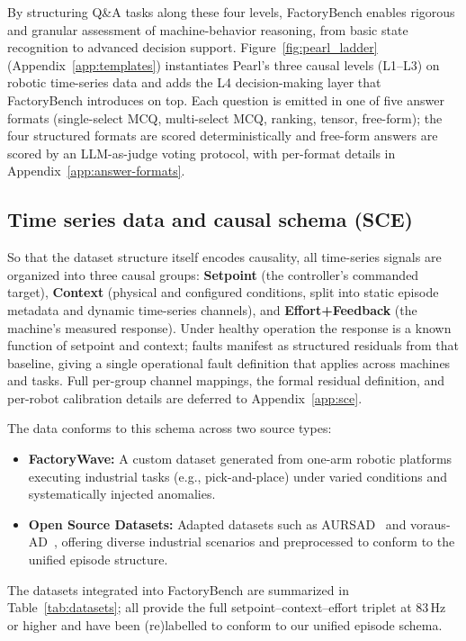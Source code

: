 \documentclass{article}
\begin{document}
By structuring Q\&A tasks along these four levels, FactoryBench enables rigorous and granular assessment of machine-behavior reasoning, from basic state recognition to advanced decision support. Figure~\ref{fig:pearl_ladder} (Appendix~\ref{app:templates}) instantiates Pearl's three causal levels (L1--L3) on robotic time-series data and adds the L4 decision-making layer that FactoryBench introduces on top. Each question is emitted in one of five answer formats (single-select MCQ, multi-select MCQ, ranking, tensor, free-form); the four structured formats are scored deterministically and free-form answers are scored by an LLM-as-judge voting protocol, with per-format details in Appendix~\ref{app:answer-formats}.


\subsection{Time series data and causal schema (SCE)}
\label{sec:sce}

So that the dataset structure itself encodes causality, all time-series signals are organized into three causal groups: \textbf{Setpoint} (the controller's commanded target), \textbf{Context} (physical and configured conditions, split into static episode metadata and dynamic time-series channels), and \textbf{Effort+Feedback} (the machine's measured response). Under healthy operation the response is a known function of setpoint and context; faults manifest as structured residuals from that baseline, giving a single operational fault definition that applies across machines and tasks. Full per-group channel mappings, the formal residual definition, and per-robot calibration details are deferred to Appendix~\ref{app:sce}.

The data conforms to this schema across two source types:

\begin{itemize}
    \item \textbf{FactoryWave:} A custom dataset generated from one-arm robotic platforms executing industrial tasks (e.g., pick-and-place) under varied conditions and systematically injected anomalies.
    \item \textbf{Open Source Datasets:} Adapted datasets such as AURSAD~\cite{leporowski2022aursad} and voraus-AD~\cite{brockmann2023vorausad}, offering diverse industrial scenarios and preprocessed to conform to the unified episode structure.
\end{itemize}

The datasets integrated into FactoryBench are summarized in Table~\ref{tab:datasets}; all provide the full setpoint--context--effort triplet at 83\,Hz or higher and have been (re)labelled to conform to our unified episode schema.
\end{document}
